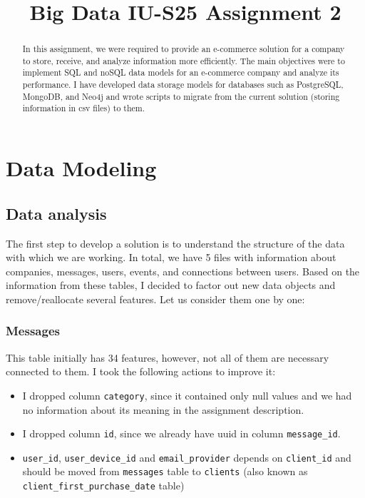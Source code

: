 \documentclass[conference]{IEEEtran}
\newcommand{\code}[1]{\colorbox{codegray}{\texttt{#1}}}
\begin{document}
\title{Big Data IU-S25 Assignment 2}

\author{
}

\maketitle

\begin{abstract}

In this assignment, we were required to provide an e-commerce solution for a company to store, receive, and analyze information more efficiently. The main objectives were to implement SQL and noSQL data models for an e-commerce company and analyze its performance. I have developed data storage models for databases such as PostgreSQL, MongoDB, and Neo4j and wrote scripts to migrate from the current solution (storing information in csv files) to them.

\end{abstract}

\section{Data Modeling}

\subsection{Data analysis}

The first step to develop a solution is to understand the structure of the data with which we are working. In total, we have 5 files with information about companies, messages, users, events, and connections between users. Based on the information from these tables, I decided to factor out new data objects and remove/reallocate several features. Let us consider them one by one:

\subsubsection{Messages}

This table initially has 34 features, however, not all of them are necessary connected to them. I took the following actions to improve it:
\begin{itemize}
    \item I dropped column \code{category}, since it contained only null values and we had no information about its meaning in the assignment description.
    \item I dropped column \code{id}, since we already have uuid in column \code{message\_id}.
    \item \code{user\_id}, \code{user\_device\_id} and \code{email\_provider} depends on \code{client\_id} and should be moved from \code{messages} table to \code{clients} (also known as \code{client\_first\_purchase\_date} table)
\end{itemize}
\end{document}
